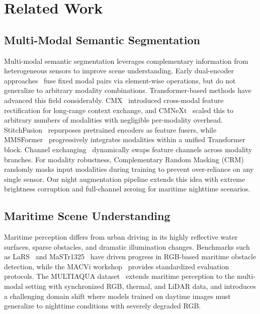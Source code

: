 \section{Related Work}
\label{sec:related}

\subsection{Multi-Modal Semantic Segmentation}

Multi-modal semantic segmentation leverages complementary information from heterogeneous sensors to improve scene understanding.
Early dual-encoder approaches~\cite{hazirbas2017fusenet, sun2019rtfnet} fuse fixed modal pairs via element-wise operations, but do not generalize to arbitrary modality combinations.
Transformer-based methods have advanced this field considerably.
CMX~\cite{zhang2022cmx} introduced cross-modal feature rectification for long-range context exchange, and CMNeXt~\cite{zhang2023delivering} scaled this to arbitrary numbers of modalities with negligible per-modality overhead.
StitchFusion~\cite{li2024stitchfusion} repurposes pretrained encoders as feature fusers, while MMSFormer~\cite{reza2024mmsformer} progressively integrates modalities within a unified Transformer block.
Channel exchanging~\cite{wang2020deep} dynamically swaps feature channels across modality branches.
For modality robustness, Complementary Random Masking (CRM)~\cite{shin2024crm} randomly masks input modalities during training to prevent over-reliance on any single sensor.
Our night augmentation pipeline extends this idea with extreme brightness corruption and full-channel zeroing for maritime nighttime scenarios.


\subsection{Maritime Scene Understanding}

Maritime perception differs from urban driving in its highly reflective water surfaces, sparse obstacles, and dramatic illumination changes.
Benchmarks such as LaRS~\cite{zust2023larsd} and MaSTr1325~\cite{bovcon2019mastr} have driven progress in RGB-based maritime obstacle detection, while the MACVi workshop~\cite{bovcon2024macvi, kiefer2024macvi} provides standardized evaluation protocols.
The MULTIAQUA dataset~\cite{muhovic2025multiaqua} extends maritime perception to the multi-modal setting with synchronized RGB, thermal, and LiDAR data, and introduces a challenging domain shift where models trained on daytime images must generalize to nighttime conditions with severely degraded RGB.


